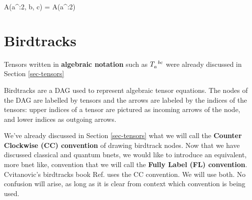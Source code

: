 \beq
A(a^{:2}, b, c)
=
\bcen
{}
\ecen
A(a^{:2})
\eeq




\section{Birdtracks}

Tensors written in 
{\bf algebraic notation}
such as $T\indices{_a^b^c}$
were already discussed in
Section \ref{sec-tensors}

Birdtracks are a 
DAG used to represent 
algebraic tensor equations. 
The nodes of the DAG
are labelled by tensors and the 
arrows are labeled by the indices of 
the tensors: upper indices of a tensor are 
pictured as incoming arrows of the node,
and lower indices as outgoing arrows. 

We've
already discussed
in Section \ref{sec-tensors}
what we will
call the {\bf Counter Clockwise (CC) convention}  of drawing 
birdtrack nodes.
Now that we have 
discussed classical
and quantum bnets,
we would like to introduce an equivalent, more bnet like, convention that
we will call the {\bf Fully Label (FL) convention}.
Cvitanovic's
birdtracks book Ref.\cite{birdtracks-book}
uses the CC convention. 
We will use both.
No confusion will arise,
as long as it is clear
from context 
which convention
is being used.

